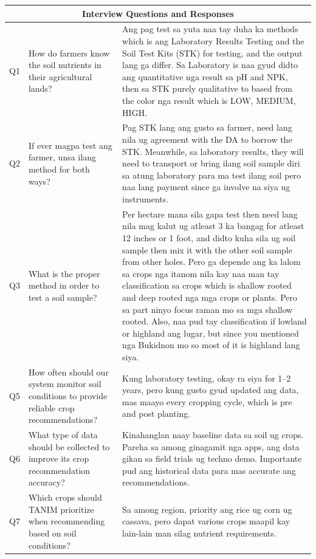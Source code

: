 {\begin{longtable}{p{1.8cm}p{3.5cm}p{7.5cm}}
		\midrule
		\multicolumn{3}{c}{\textbf{Interview Questions and Responses}} \\
		\midrule
		
		Q1 & How do farmers know the soil nutrients in their agricultural lands? & 
		Ang pag test sa yuta naa tay duha ka methods which is ang Laboratory Results Testing and the Soil Test Kits (STK) for testing, and the output lang ga differ. Sa Laboratory is naa gyud didto ang quantitative nga result sa pH and NPK, then sa STK purely qualitative to based from the color nga result which is LOW, MEDIUM, HIGH. \\
		
		Q2 & If ever magpa test ang farmer, unsa ilang method for both ways? & 
		Pag STK lang ang gusto sa farmer, need lang nila ug agreement with the DA to borrow the STK. Meanwhile, sa laboratory results, they will need to transport or bring ilang soil sample diri sa atung laboratory para ma test ilang soil pero naa lang payment since ga involve na siya ug instruments. \\
		
		Q3 & What is the proper method in order to test a soil sample? & 
		Per hectare mana sila gapa test then need lang nila mag kalut ug atleast 3 ka bangag for atleast 12 inches or 1 foot, and didto kuha sila ug soil sample then mix it with the other soil sample from other holes. Pero ga depende ang ka lalom sa crops nga itanom nila kay naa man tay classification sa crops which is shallow rooted and deep rooted nga mga crops or plants. Pero sa part ninyo focus raman mo sa mga shallow rooted. Also, naa pud tay classification if lowland or highland ang lugar, but since you mentioned nga Bukidnon mo so most of it is highland lang siya. \\
		
		Q5 & How often should our system monitor soil conditions to provide reliable crop recommendations? & 
		Kung laboratory testing, okay ra siya for 1--2 years, pero kung gusto gyud updated ang data, mas maayo every cropping cycle, which is pre and post planting. \\
		
		Q6 & What type of data should be collected to improve its crop recommendation accuracy? & 
		Kinahanglan naay baseline data sa soil ug crops. Pareha sa among ginagamit nga apps, ang data gikan sa field trials ug techno demo. Importante pud ang historical data para mas accurate ang recommendations. \\
		
		Q7 & Which crops should TANIM prioritize when recommending based on soil conditions? & 
		Sa among region, priority ang rice ug corn ug cassava, pero dapat various crops maapil kay lain-lain man silag nutrient requirements. \\
		

\end{longtable}}
